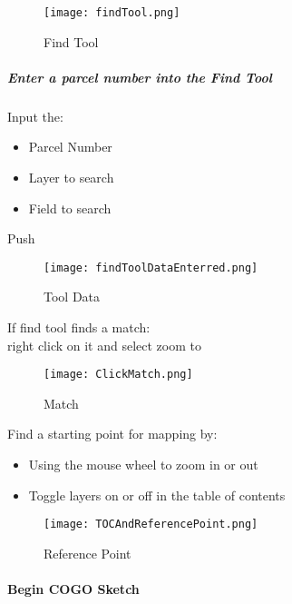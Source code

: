 \begin{figure}[h!]
\centering
    \texttt{[image: findTool.png]}

\caption{Find Tool}
\end{figure}
%

\clearpage

\subparagraph*{Enter a parcel number into the Find Tool}

Input the:
\begin{itemize}
\item Parcel Number
\item Layer to search
\item Field to search
\end{itemize} 

{\bigbtn Push }

\begin{figure}[h!]
\centering
    \texttt{[image: findToolDataEnterred.png]}

\caption{Tool Data}
\end{figure}
%
\clearpage

\noindent If find tool finds a match:\\
\noindent right click on it and select zoom to

\begin{figure}[h!]
\centering
    \texttt{[image: ClickMatch.png]}

\caption{Match}
\end{figure}
%
\clearpage

Find a starting point for mapping by:
\begin{itemize}

\item Using the mouse wheel to zoom in or out
\item Toggle layers on or off in the table of contents

\end{itemize}

\begin{figure}[h!]
\centering
    \texttt{[image: TOCAndReferencePoint.png]}

\caption{Reference Point}
\end{figure}
%
\clearpage

\paragraph{Begin COGO Sketch}

